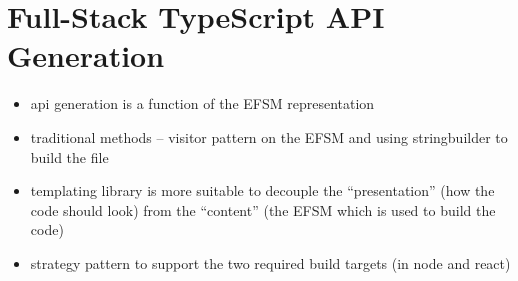 \section{Full-Stack TypeScript API Generation}

\begin{itemize}
\item api generation is a function of the EFSM representation
\item traditional methods -- visitor pattern on the EFSM and using stringbuilder to build the file
\item templating library is more suitable to decouple the ``presentation'' (how the code should look) from the ``content'' (the EFSM which is used to build the code)
\item strategy pattern to support the two required build targets (in node and react)
\end{itemize}